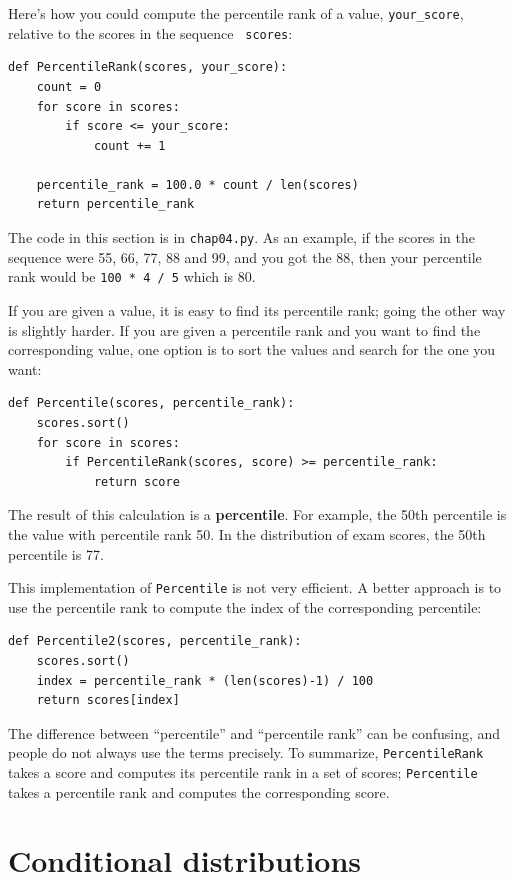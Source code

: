 \documentclass[12pt]{book}
\begin{document}
Here's how you could compute the percentile rank of a value,
\verb"your_score", relative to the scores in the sequence {\tt
  scores}:
%
\begin{verbatim}
def PercentileRank(scores, your_score):
    count = 0
    for score in scores:
        if score <= your_score:
            count += 1

    percentile_rank = 100.0 * count / len(scores)
    return percentile_rank
\end{verbatim}

The code in this section is in {\tt chap04.py}.  As an example, if the
scores in the sequence were 55, 66, 77, 88 and 99, and you got the 88,
then your percentile rank would be {\tt 100 * 4 / 5} which is 80.

If you are given a value, it is easy to find its percentile rank; going
the other way is slightly harder.  If you are given a percentile rank
and you want to find the corresponding value, one option is to
sort the values and search for the one you want:
%
\begin{verbatim}
def Percentile(scores, percentile_rank):
    scores.sort()
    for score in scores:
        if PercentileRank(scores, score) >= percentile_rank:
            return score
\end{verbatim}

The result of this calculation is a {\bf percentile}.  For example,
the 50th percentile is the value with percentile rank 50.  In the
distribution of exam scores, the 50th percentile is 77.

This implementation of {\tt Percentile} is not very efficient.  A
better approach is to use the percentile rank to compute the index of
the corresponding percentile:

\begin{verbatim}
def Percentile2(scores, percentile_rank):
    scores.sort()
    index = percentile_rank * (len(scores)-1) / 100
    return scores[index]
\end{verbatim}

The difference between ``percentile'' and ``percentile rank'' can
be confusing, and people do not always use the terms precisely.
To summarize, {\tt PercentileRank} takes a score and computes
its percentile rank in a set of scores; {\tt Percentile} takes
a percentile rank and computes the corresponding score.


\section{Conditional distributions}
\end{document}
